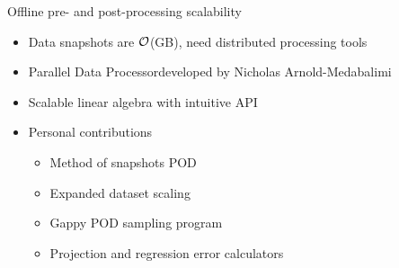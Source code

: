 \documentclass[]{beamer}
\begin{document}
\begin{frame}{Offline pre- and post-processing scalability}
	\begin{itemize}
		\item Data snapshots are $\mathcal{O}$(GB), need distributed processing tools
		\item Parallel Data Processor\footnotemark[12] developed by Nicholas Arnold-Medabalimi
		\item Scalable linear algebra with intuitive API
		\item Personal contributions
		\begin{itemize}
			\item Method of snapshots POD
			\item Expanded dataset scaling
			\item Gappy POD sampling program
			\item Projection and regression error calculators
		\end{itemize}
	\end{itemize}
\end{frame}
\end{document}
